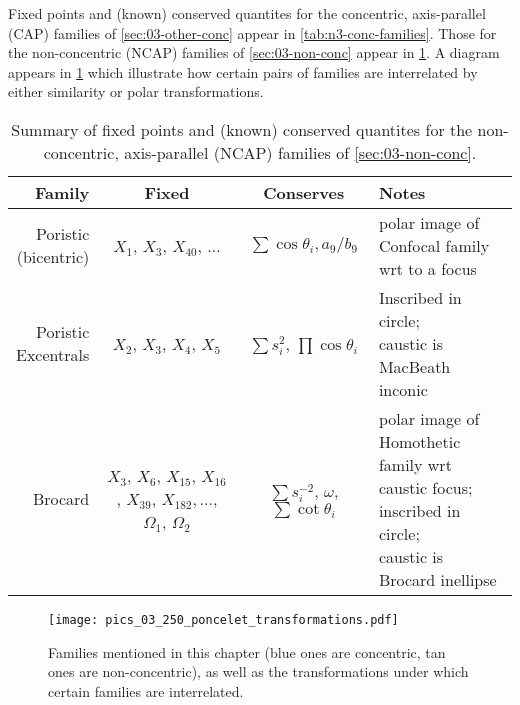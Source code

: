 Fixed points and (known) conserved quantites for the concentric, axis-parallel (CAP) families of \cref{sec:03-other-conc} appear in
\cref{tab:n3-conc-families}. Those for the non-concentric (NCAP) families of \cref{sec:03-non-conc} appear in
\cref{tab:n3-non-conc-families}. A diagram appears in \cref{fig:03-transformations} which illustrate how certain pairs of families are interrelated by either similarity or polar transformations.

\begin{table}
\centering
\begin{tabular}{|r|c|c|l|}
\hline
Family & Fixed & Conserves & Notes \\
\hline
\makecell[rc]{Poristic\\(bicentric)} & $X_1$, $X_3$, $X_{40}$, $\ldots$ & $\sum\cos\theta_i,a_9/b_9$ & \makecell[lc]{polar image of Confocal family\\wrt to a focus} \\
\hline
\makecell[rt]{Poristic\\Excentrals} & $X_2$, $X_3$, $X_4$, $X_5$ & $\sum{s_i^2}$, $\prod\cos\theta_i$ & \makecell[lt]{Inscribed in circle;\\caustic is MacBeath inconic} \\
\hline
Brocard & \makecell[lc]{$X_3$, $X_6$, $X_{15}$, $X_{16}$,\\$X_{39}$, $X_{182},\ldots$,\\$\Omega_1$, $\Omega_2$} & $\sum{s_i^{-2}}$, $\omega$, $\sum\cot\theta_i$ & \makecell[lc]{polar image of Homothetic\\family wrt caustic focus;\\inscribed in circle;\\caustic is Brocard inellipse}\\
\hline
\end{tabular}
\caption{Summary of fixed points and (known) conserved quantites for the non-concentric, axis-parallel (NCAP) families of \cref{sec:03-non-conc}.}
\label{tab:n3-non-conc-families}
\end{table}

\begin{figure}
    \centering
    \texttt{[image: pics\_03\_250\_poncelet\_transformations.pdf]}
  \caption{Families mentioned in this chapter (blue ones are concentric, tan ones are non-concentric), as well as the transformations under which certain families are interrelated.}
    \label{fig:03-transformations}
\end{figure}

